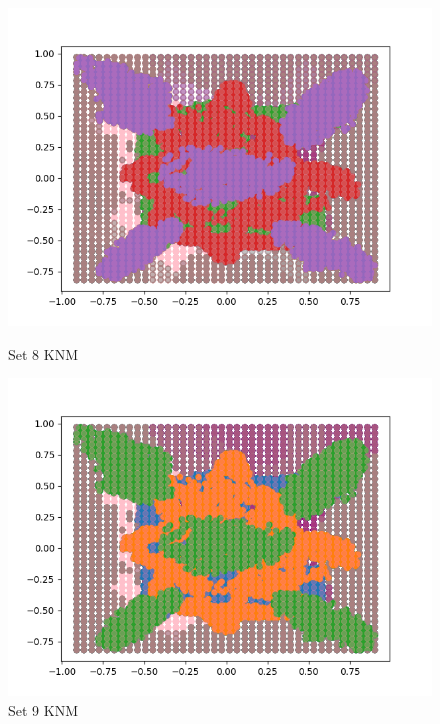 \documentclass{article}
\begin{document}
\begin{figure}[H]
	\centering
	\begin{minipage}{.33\textwidth}
			\centering
			\includegraphics[width=1\linewidth]{../set8KNMdecisions.png}
			\caption{Set 8 KNM}
	\end{minipage}\hfill
        \centering
	\begin{minipage}{.33\textwidth}
			\centering
			\includegraphics[width=1\linewidth]{../set9KNMdecisions.png}
			\caption{Set 9 KNM}
	\end{minipage}\hfill
        \centering
	\begin{minipage}{.33\textwidth}
			\centering

\end{minipage}
\end{figure}
\end{document}
